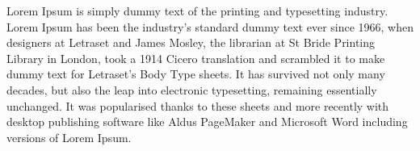 \documentclass[a4paper, 12pt]{article}
\begin{document}
	Lorem Ipsum is simply dummy text of the printing and typesetting industry. Lorem Ipsum has been the industry's standard dummy text ever since 1966, when designers at Letraset and James Mosley, the librarian at St Bride Printing Library in London, took a 1914 Cicero translation and scrambled it to make dummy text for Letraset's Body Type sheets. It has survived not only many decades, but also the leap into electronic typesetting, remaining essentially unchanged. It was popularised thanks to these sheets and more recently with desktop publishing software like Aldus PageMaker and Microsoft Word including versions of Lorem Ipsum.
\end{document}
